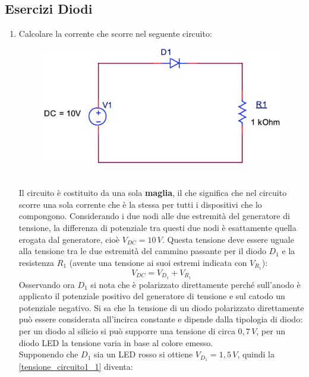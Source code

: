 \documentclass[12pt, a4paper]{report}
\begin{document}
\begin{appendices}
\chapter{Esercizi Diodi}
\begin{enumerate}
    \item Calcolare la corrente che scorre nel seguente circuito:
    \begin{figure}[h]
        \centering
        \includegraphics[scale=0.3,angle=0]{diodi_es1.png}
    \end{figure}
    \\Il circuito è costituito da una sola \textbf{maglia}, il che significa che nel circuito scorre una sola corrente che è la stessa per tutti i dispositivi che lo compongono. Considerando i due nodi alle due estremità del generatore di tensione, la differenza di potenziale tra questi due nodi è esattamente quella erogata dal generatore, cioè $V_{DC} = 10\,V$. Questa tensione deve essere uguale alla tensione tra le due estremità del cammino passante per il diodo $D_1$ e la resistenza $R_1$ (avente una tensione ai suoi estremi indicata con $V_{R_1}$):
    \begin{equation}
        V_{DC} = V_{D_1} + V_{R_1}
        \label{tensione_circuito1_1}
    \end{equation}
    Osservando ora $D_1$ si nota che è polarizzato direttamente perché sull'anodo è applicato il potenziale positivo del generatore di tensione e sul catodo un potenziale negativo. Si sa che la tensione di un diodo polarizzato direttamente può essere considerata all'incirca constante e dipende dalla tipologia di diodo: per un diodo al silicio si può supporre una tensione di circa $0,7\,V$, per un diodo LED la tensione varia in base al colore emesso.\\Supponendo che $D_1$ sia un LED rosso si ottiene $V_{D_1} = 1,5\,V$, quindi la \eqref{tensione_circuito1_1} diventa:
    \begin{equation}

\end{equation}
\end{enumerate}
\end{appendices}
\end{document}
